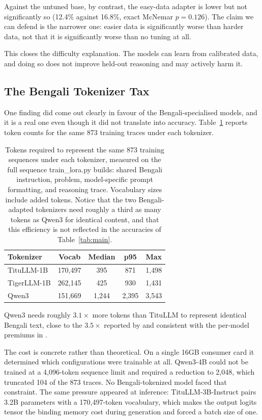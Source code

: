 \documentclass[10pt,twocolumn,letterpaper]{article}
\begin{document}
Against the untuned base, by contrast, the easy-data adapter is lower but not
significantly so (12.4\% against 16.8\%, exact McNemar $p=0.126$). The claim we
can defend is the narrower one: easier data is significantly worse than harder
data, not that it is significantly worse than no tuning at all.

This closes the difficulty explanation. The models can learn from calibrated
data, and doing so does not improve held-out reasoning and may actively harm it.

\subsection{The Bengali Tokenizer Tax}
\label{sec:tokenizer}

One finding did come out clearly in favour of the Bengali-specialised models,
and it is a real one even though it did not translate into accuracy.
Table~\ref{tab:tokenizer} reports token counts for the same 873 training
traces under each tokenizer.

\begin{table}[htbp]
\caption{Tokens required to represent the same 873 training sequences
under each tokenizer, measured on the full sequence train\_lora.py
builds: shared Bengali instruction, problem, model-specific prompt
formatting, and reasoning trace. Vocabulary sizes include added tokens.
Notice that the two Bengali-adapted tokenizers need roughly a third as
many tokens as Qwen3 for identical content, and that this efficiency is
not reflected in the accuracies of Table~\ref{tab:main}.}
\label{tab:tokenizer}
\centering
\begin{tabular}{|l|c|c|c|c|}
\hline
\textbf{Tokenizer} & \textbf{Vocab} & \textbf{Median} & \textbf{p95} & \textbf{Max} \\
\hline
TituLLM-1B & 170,497 & 395 & 871 & 1,498 \\
TigerLLM-1B & 262,145 & 425 & 930 & 1,431 \\
Qwen3 & 151,669 & 1,244 & 2,395 & 3,543 \\
\hline
\end{tabular}
\end{table}

Qwen3 needs roughly $3.1\times$ more tokens than TituLLM to represent identical
Bengali text, close to the $3.5\times$ reported by
\textcite{yong2025crosslingual} and consistent with the per-model premiums in
\textcite{petrov2023language}.

The cost is concrete rather than theoretical. On a single 16GB consumer card it
determined which configurations were trainable at all. Qwen3-4B could not be
trained at a 4,096-token sequence limit and required a reduction to 2,048, which
truncated 104 of the 873 traces. No Bengali-tokenized model faced that
constraint. The same pressure appeared at inference: TituLLM-3B-Instruct pairs
3.2B parameters with a 170,497-token vocabulary, which makes the output logits
tensor the binding memory cost during generation and forced a batch size of one.
\end{document}

